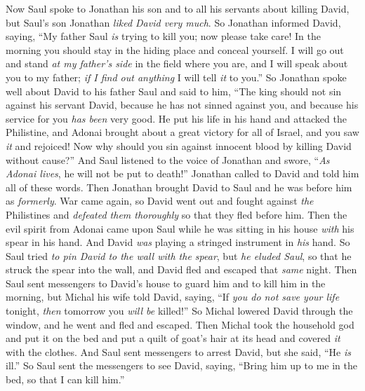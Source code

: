 \begin{biblechapter} %
 Now Saul spoke to Jonathan his son and to all his servants about killing David, but Saul’s son Jonathan \textit{liked David very much}.
\verse So Jonathan informed David, saying, “My father Saul \textit{is} trying to kill you; now please take care! In the morning you should stay in the hiding place and conceal yourself.
\verse I will go out and stand \textit{at my father’s side} in the field where you are, and I will speak about you to my father; \textit{if I find out anything} I will tell \textit{it} to you.”
\verse So Jonathan spoke well about David to his father Saul and said to him, “The king should not sin against his servant David, because he has not sinned against you, and because his service for you \textit{has been} very good.
\verse He put his life in his hand and attacked the Philistine, and Adonai brought about a great victory for all of Israel, and you saw \textit{it} and rejoiced! Now why should you sin against innocent blood by killing David without cause?”
\verse And Saul listened to the voice of Jonathan and swore, “\textit{As Adonai lives}, he will not be put to death!”
\verse Jonathan called to David and told him all of these words. Then Jonathan brought David to Saul and he was before him as \textit{formerly}.
 War came again, so David went out and fought against \textit{the} Philistines and \textit{defeated them thoroughly} so that they fled before him.
\verse Then the evil spirit from Adonai came upon Saul while he was sitting in his house \textit{with} his spear in his hand. And David \textit{was} playing a stringed instrument in \textit{his} hand.
\verse So Saul tried \textit{to pin David to the wall with the spear}, but \textit{he eluded Saul}, so that he struck the spear into the wall, and David fled and escaped that \textit{same} night.
\verse Then Saul sent messengers to David’s house to guard him and to kill him in the morning, but Michal his wife told David, saying, “If \textit{you do not save your life} tonight, \textit{then} tomorrow you \textit{will be} killed!”
\verse So Michal lowered David through the window, and he went and fled and escaped.
\verse Then Michal took the household god and put it on the bed and put a quilt of goat’s hair at its head and covered \textit{it} with the clothes.
\verse And Saul sent messengers to arrest David, but she said, “He \textit{is} ill.”
\verse So Saul sent the messengers to see David, saying, “Bring him up to me in the bed, so that I can kill him.”

\end{biblechapter}
